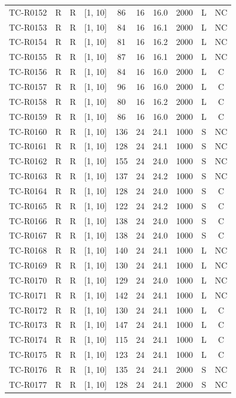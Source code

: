 \begin{longtable}{lccccccccc}
TC-R0152 & R & R & [1, 10] & 86 & 16 & 16.0 & 2000 & L & NC \\
TC-R0153 & R & R & [1, 10] & 84 & 16 & 16.1 & 2000 & L & NC \\
TC-R0154 & R & R & [1, 10] & 81 & 16 & 16.2 & 2000 & L & NC \\
TC-R0155 & R & R & [1, 10] & 87 & 16 & 16.1 & 2000 & L & NC \\
TC-R0156 & R & R & [1, 10] & 84 & 16 & 16.0 & 2000 & L & C \\
TC-R0157 & R & R & [1, 10] & 96 & 16 & 16.0 & 2000 & L & C \\
TC-R0158 & R & R & [1, 10] & 80 & 16 & 16.2 & 2000 & L & C \\
TC-R0159 & R & R & [1, 10] & 86 & 16 & 16.0 & 2000 & L & C \\
TC-R0160 & R & R & [1, 10] & 136 & 24 & 24.1 & 1000 & S & NC \\
TC-R0161 & R & R & [1, 10] & 128 & 24 & 24.1 & 1000 & S & NC \\
TC-R0162 & R & R & [1, 10] & 155 & 24 & 24.0 & 1000 & S & NC \\
TC-R0163 & R & R & [1, 10] & 137 & 24 & 24.2 & 1000 & S & NC \\
TC-R0164 & R & R & [1, 10] & 128 & 24 & 24.0 & 1000 & S & C \\
TC-R0165 & R & R & [1, 10] & 122 & 24 & 24.2 & 1000 & S & C \\
TC-R0166 & R & R & [1, 10] & 138 & 24 & 24.0 & 1000 & S & C \\
TC-R0167 & R & R & [1, 10] & 138 & 24 & 24.0 & 1000 & S & C \\
TC-R0168 & R & R & [1, 10] & 140 & 24 & 24.1 & 1000 & L & NC \\
TC-R0169 & R & R & [1, 10] & 130 & 24 & 24.1 & 1000 & L & NC \\
TC-R0170 & R & R & [1, 10] & 129 & 24 & 24.0 & 1000 & L & NC \\
TC-R0171 & R & R & [1, 10] & 142 & 24 & 24.1 & 1000 & L & NC \\
TC-R0172 & R & R & [1, 10] & 130 & 24 & 24.1 & 1000 & L & C \\
TC-R0173 & R & R & [1, 10] & 147 & 24 & 24.1 & 1000 & L & C \\
TC-R0174 & R & R & [1, 10] & 115 & 24 & 24.1 & 1000 & L & C \\
TC-R0175 & R & R & [1, 10] & 123 & 24 & 24.1 & 1000 & L & C \\
TC-R0176 & R & R & [1, 10] & 135 & 24 & 24.1 & 2000 & S & NC \\
TC-R0177 & R & R & [1, 10] & 128 & 24 & 24.1 & 2000 & S & NC \\

\end{longtable}
